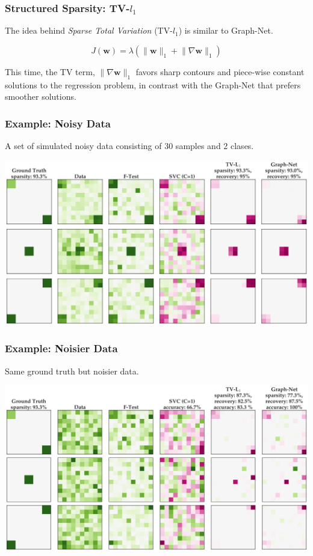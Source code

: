 \documentclass[11pt]{beamer}
\begin{document}
\begin{frame}
  \frametitle{Structured Sparsity: TV-$l_1$}
  The idea behind \emph{Sparse Total Variation} (TV-$l_{1}$) is similar to
  Graph-Net. 

  \[J(\mathbf{w}) = \lambda \left( \lVert{\mathbf{w}}\rVert _{1} + 
   \lVert{\nabla\mathbf{w}}\rVert _{1}\right) \]

  This time, the TV term, $\lVert{\nabla\mathbf{w}}\rVert _{1}$ favors sharp
  contours and piece-wise constant solutions to the regression problem, in contrast
  with the Graph-Net that prefers smoother solutions.
\end{frame}
\begin{frame}[t]
  \frametitle{Example: Noisy Data}
  A set of simulated noisy data consisting of 30 samples and 2 clases. 
  \begin{center}
    \includegraphics[scale=0.25]{figures/weights_synthetic_data_2.62_cbc.png} 
  \end{center}
\end{frame}
\begin{frame}[t]
  \frametitle{Example: Noisier Data}
  Same ground truth but noisier data.
  \begin{center}
    \includegraphics[scale=0.25]{figures/weights_sparse_synthetic_data_1.39_cbc.png} 
  \end{center}
\end{frame}
\end{document}
